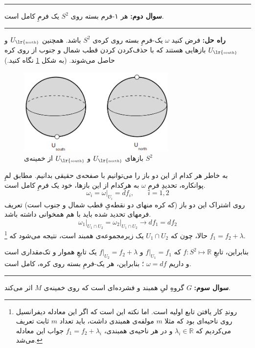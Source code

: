 \documentclass[a4paper, 12pt]{article}
\begin{document}
\par\noindent\rule{\textwidth}{2pt}



\vspace{0.5em}
\noindent
\textbf{سوال دوم:}
هر 
۱-فرم بسته روی $S^2$ یک فرمِ کامل است.
\par\noindent\rule{\textwidth}{0.6pt}
\textbf{راه حل:}
فرض کنید
$\omega$
یک-فرمِ بسته روی کره‌ی 
$S^2$
باشد. همچنین 
$U_{\text{\lr{\tiny north}}}$
و
$U_{\text{\lr{\tiny south}}}$
 بازهایی هستند که با حذف‌کردن کردن قطب شمال و جنوب از روی کره حاصل می‌شوند. (به شکل 
 \ref{fig1}
  نگاه کنید.)
\begin{figure}[h]
	\centering
	\includegraphics[width=21em]{Pics/1.png}
	\caption{بازهای 
	$U_{\text{\lr{\tiny north}}}$
	و
	$U_{\text{\lr{\tiny south}}}$
	از خمینه‌ی 
	$S^2$}
	\label{fig1}
\end{figure}
به خاطر 
هر کدام از این دو باز را می‌توانیم با صفحه‌ی حقیقی 
بدانیم. مطابق لمِ پوانکاره، تحدیدِ فرمِ 
$\omega$
به هرکدام از این بازها، خود یک فرمِ کامل است.
\[
\omega_i = \omega\big|_{U_i} = df_i, \qquad i=1,2
\]
روی اشتراک این دو باز (که کره منهای دو نقطه‌یِ قطب شمال و جنوب است) تعریف فرمهای تحدید شده باید با هم همخوانی داشته باشد.
\[
\omega_1\big|_{U_1 \cap U_2} = \omega_2\big|_{U_1 \cap U_2} \xrightarrow{\quad} df_1 = df_2
\]
حالا، چون که 
$U_1 \cap U_2$
یک زیرمجموعه‌ی همبند است، نتیجه می‌شود که 
\footnote{روندِ کار یافتن تابع اولیه است. اما نکته این است که اگر این معادله دیفرانسیل روی ناحیه‌ای بود که مثلا $m$ مولفه‌ی همبندی داشت، باید تعداد
$m$ ثابت تعریف می‌کردیم
که 
$\lambda_i \in \mathbb{R}$
 و در هر ناحیه‌ی همبندی، 
$f_1 = f_2 + \lambda_i$
جواب این معادله می‌شد.
}
$f_1 = f_2 + \lambda$.

بنابراین، تابعِ 
$f : S^2 \longmapsto \mathbb{R}$
که 
$f\big|_{U_1} = f_1$
و 
$f\big|_{U_2} = f_2 + \lambda$
یک تابعِ هموار و تک‌مقداری است و داریم 
$\omega = df$
؛ بنابراین، هر یک-فرمِ بسته روی کره، کامل است.
\par\noindent\rule{\textwidth}{2pt}


\vspace{0.5em}
\noindent
\textbf{سوال سوم:}
$G$ گروه‌ِ لیِ همبند و فشرده‌ای است که روی خمینه‌ی $M$ اثر می‌کند.
\end{document}
